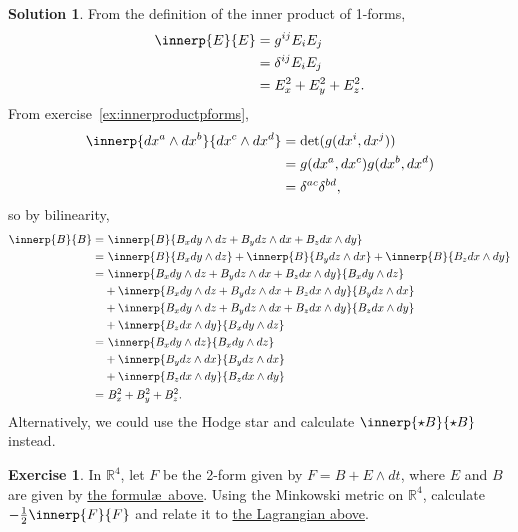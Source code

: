 \documentclass[11pt, a4paper]{article}
\theoremstyle{definition}
\newtheorem{ex}{Exercise}[part]
\newtheorem{sol}{Solution}[part]
\begin{document}
\begin{sol}

From the definition of the inner product of 1-forms,
\begin{align*}
    \innerp{E}{E} &= g^{ij} E_i E_j \\
                  &= \delta^{ij} E_i E_j \\
                  &= E_x^2 + E_y^2 + E_z^2.
\end{align*}
From exercise~\ref{ex:innerproductpforms},
\begin{align*}
    \innerp{dx^a \wedge dx^b}{dx^c \wedge dx^d} &= \det(g(dx^i, dx^j)) \\
        &= g(dx^a, dx^c) g(dx^b, dx^d) \\
        &= \delta^{ac} \delta^{bd},
\end{align*}
so by bilinearity,
\begin{align*}
    \innerp{B}{B} =&\ \innerp{B}{B_x dy \wedge dz + B_y dz \wedge dx + B_z dx \wedge dy} \\
        =&\ \innerp{B}{B_x dy \wedge dz}
            + \innerp{B}{B_y dz \wedge dx}
            + \innerp{B}{B_z dx \wedge dy} \\
        =&\ \innerp{B_x dy \wedge dz + B_y dz \wedge dx + B_z dx \wedge dy}
                   {B_x dy \wedge dz} \\
        &+ \innerp{B_x dy \wedge dz + B_y dz \wedge dx + B_z dx \wedge dy}
                  {B_y dz \wedge dx} \\
        &+ \innerp{B_x dy \wedge dz + B_y dz \wedge dx + B_z dx \wedge dy}
                  {B_z dx \wedge dy} \\
        &+ \innerp{B_z dx \wedge dy}{B_x dy \wedge dz} \\
        =&\ \innerp{B_x dy \wedge dz}{B_x dy \wedge dz} \\
        &+ \innerp{B_y dz \wedge dx}{B_y dz \wedge dx} \\
        &+ \innerp{B_z dx \wedge dy}{B_z dx \wedge dy} \\
        =&\ B_x^2 + B_y^2 + B_z^2.
\end{align*}
Alternatively, we could use the Hodge star and calculate $\innerp{\star B}{\star B}$ instead.

\end{sol}

\begin{ex}

In $\mathbb{R}^4$, let $F$ be the 2-form given by $F = B + E \wedge dt$, where $E$ and $B$ are given by \hyperref[ex:esquaredbsquared]{the formul\ae\ above}. Using the Minkowski metric on $\mathbb{R}^4$, calculate $-\frac{1}{2} \innerp{F}{F}$ and relate it to \hyperref[eq:lagrangianvacuumem]{the Lagrangian above}.

\end{ex}
\end{document}
